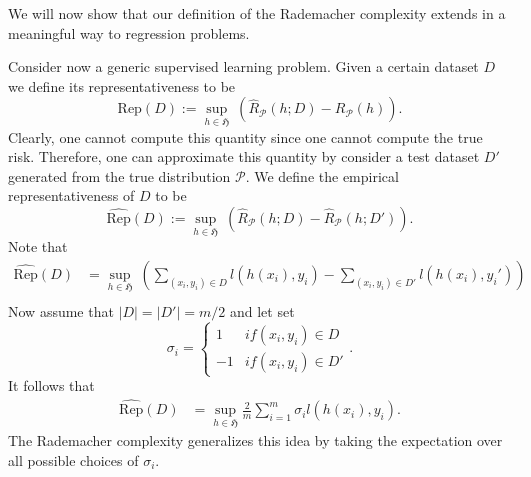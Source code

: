We will now show that our definition of the Rademacher complexity extends in a
meaningful way to regression
problems. 

Consider now a generic
supervised learning problem. Given a certain dataset $D$ we define its
representativeness to be
$$
\text{Rep}(D) := \sup_{h \in \mathfrak{H}} \ (\hat{R}_\mathcal{P}(h;D) - R_\mathcal{P}(h)).
$$
Clearly, one cannot compute this quantity since one cannot compute the true
risk. Therefore, one can approximate this quantity by consider a test dataset
$D'$ generated from the true distribution $\mathcal{P}$. We define the empirical
representativeness of $D$ to be 
$$
\hat{\text{Rep}}(D) := \sup_{h \in \mathfrak{H}} \ (\hat{R}_\mathcal{P}(h;D) - \hat{R}_{\mathcal{P}}(h;D')).
$$
Note that 
\begin{align*}
	\hat{\text{Rep}}(D) &= \sup_{h \in \mathfrak{H}} \ (\sum_{(x_i, y_i) \in D} l(h(x_i), y_i) - \sum_{(x_i, y_i) \in D'} l(h(x_i), y_i'))\\
\end{align*}
Now assume that $|D|=|D'|=m/2$ and let set 
\begin{equation*}
	\sigma_i= \begin{cases}
		1 & if (x_i, y_i) \in D\\
		-1 & if (x_i, y_i) \in D'
	\end{cases}.
\end{equation*}
It follows that 
\begin{align*}
	\hat{\text{Rep}}(D) 
	&= \sup_{h \in \mathfrak{H}} \frac{2}{m} \sum_{i=1}^{m} \sigma_i l(h(x_i), y_i).
\end{align*}
The Rademacher complexity generalizes this idea by taking the expectation over all possible choices of $\sigma_i$.

